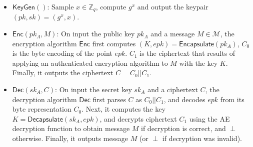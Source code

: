 \documentclass[12pt]{article}
\begin{document}
\begin{itemize}
	\item $\mathsf{KeyGen}()$: Sample $x \in \mathbb Z_q$, compute $g^x$ and output the keypair $(pk, sk) = (g^x, x)$.
	
	\item $\mathsf{Enc}(pk_A, M)$: On input the public key $pk_A$ and a message $M\in\mathcal{M}$, the encryption algorithm $\mathsf{Enc}$ first computes $(K, epk) = \mathsf{Encapsulate}(pk_A)$, 
	$C_0$ is the byte encoding of the point $epk$. $C_1$ is the ciphertext that results of applying an authenticated encryption algorithm to $M$ with the key $K$. 
	Finally, it outputs the ciphertext $C = C_0||C_1$.
	
		\item $\mathsf{Dec}(sk_A, C)$: On input the secret key $sk_A$ and a ciphertext $C$, the decryption algorithm $\mathsf{Dec}$ first parses $C$ as $C_0||C_1$, and decodes $epk$ from its byte representation $C_0$. Next, it computes the key $K = \mathsf{Decapsulate}(sk_A, epk)$, and decrypts ciphertext $C_1$ using the AE decryption function to obtain message $M$ if decryption is correct, and $\perp$ otherwise. Finally, it outputs message $M$ (or $\perp$ if decryption was invalid).
%	
\end{itemize}
\end{document}
